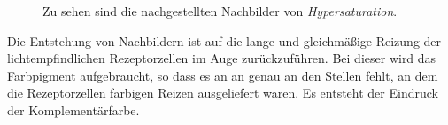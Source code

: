 \documentclass[11pt]{article}
\begin{document}
\begin{figure}[H]
\caption{Zu sehen sind die nachgestellten Nachbilder von \textit{Hypersaturation}.}
\label{hypersat_nb}
\end{figure}

Die Entstehung von Nachbildern ist auf die lange und gleichmäßige Reizung der lichtempfindlichen Rezeptorzellen im Auge zurückzuführen. Bei dieser wird das Farbpigment aufgebraucht, so dass es an an genau an den Stellen fehlt, an dem die Rezeptorzellen farbigen Reizen ausgeliefert waren. Es entsteht der Eindruck der Komplementärfarbe.
\end{document}

